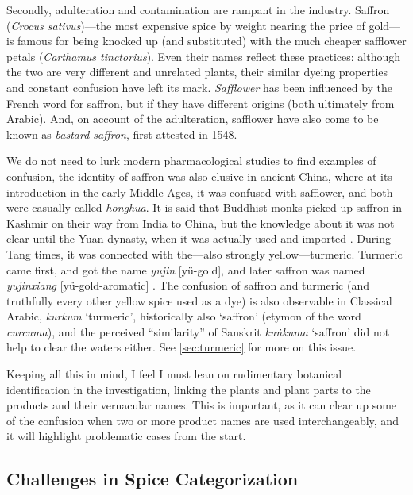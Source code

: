 Secondly, adulteration and contamination are rampant in the industry. Saffron (\textit{Crocus sativus})---the most expensive spice by weight nearing the price of gold---is famous for being knocked up (and substituted) with the much cheaper safflower petals (\textit{Carthamus tinctorius}). Even their names reflect these practices: although the two are very different and unrelated plants, their similar dyeing properties and constant confusion have left its mark. \textit{Safflower} has been influenced by the French word for saffron, but if they have different origins (both ultimately from Arabic). And, on account of the adulteration, safflower have also come to be known as \textit{bastard saffron}, first attested in 1548. 

We do not need to lurk modern pharmacological studies to find examples of confusion, the identity of saffron was also elusive in ancient China, where at its introduction in the early Middle Ages, it was confused with safflower, and both were casually called  \textit{honghua}. It is said that Buddhist monks picked up saffron in Kashmir on their way from India to China, but the knowledge about it was not clear until the Yuan dynasty, when it was actually used and imported \autocite{laufer_sino-iranica_1919}. During Tang times, it was connected with the---also strongly yellow---turmeric. Turmeric came first, and got the name  \textit{yujin} [yü-gold], and later saffron was named  \textit{yujinxiang} [yü-gold-aromatic] \autocite{schafer_golden_1985}. The confusion of saffron and turmeric (and truthfully every other yellow spice used as a dye) is also observable in Classical Arabic, \textit{kurkum} `turmeric', historically also `saffron' (etymon of the word \textit{curcuma}), and the perceived ``similarity'' of Sanskrit  \textit{kuṅkuma} `saffron' did not help to clear the waters either. See \cref{sec:turmeric} for more on this issue.

Keeping all this in mind, I feel I must lean on rudimentary botanical identification in the investigation, linking the plants and plant parts to the products and their vernacular names. This is important, as it can clear up some of the confusion when two or more product names are used interchangeably, and it will highlight problematic cases from the start.

\subsection{Challenges in Spice Categorization}

